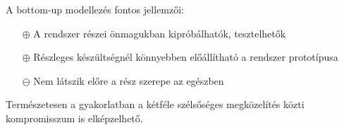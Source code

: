 A bottom-up modellezés fontos jellemzői:

\begin{itemize}
	\item[$\oplus$] A rendszer részei önmagukban kipróbálhatók, tesztelhetők
	\item[$\oplus$] Részleges készültségnél könnyebben előállítható a rendszer prototípusa
	\item[$\ominus$] Nem látszik előre a rész szerepe az egészben
\end{itemize}

Természetesen a gyakorlatban a kétféle szélsőséges megközelítés közti kompromisszum is elképzelhető.

%
%
%
%
%
%
%


